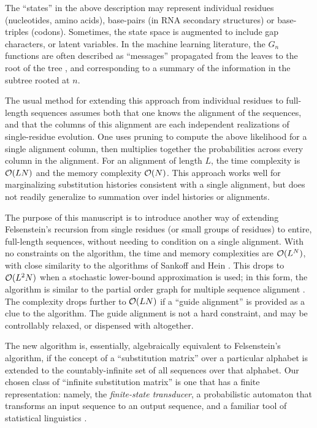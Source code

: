 \documentclass{article}
\begin{document}
The ``states'' in the above description may represent individual residues (nucleotides, amino acids), base-pairs (in RNA secondary structures) or base-triples (codons).
Sometimes, the state space is augmented to include gap characters, or latent variables.
In the machine learning literature, the $G_n$ functions are often described as ``messages'' propagated from the leaves to the root of the tree \cite{KschischangEtAl98},
and corresponding to a summary of the information in the subtree rooted at $n$.

The usual method for extending this approach from individual residues to full-length sequences assumes both that one knows the alignment of the sequences, 
and that the columns of this alignment are each independent realizations of single-residue evolution.  
One uses pruning to compute the above likelihood for a single alignment column,
then multiplies together the probabilities across every column in the alignment.
For an alignment of length $L$, the time complexity is ${\cal O}(LN)$ and the memory complexity ${\cal O}(N)$.
This approach works well for marginalizing substitution histories consistent with a single alignment,
but does not readily generalize to summation over indel histories or alignments.

The purpose of this manuscript is to introduce another way of extending Felsenstein's recursion from single residues (or small groups of residues)
to entire, full-length sequences, without needing to condition on a single alignment.
With no constraints on the algorithm,
the time and memory complexities are ${\cal O}(L^N)$,
with close similarity to the algorithms of Sankoff \cite{SankoffCedergren83} and Hein \cite{Hein2001}.
This drops to ${\cal O}(L^2 N)$ when a stochastic lower-bound approximation is used; in this form,
the algorithm is similar to the partial order graph for multiple sequence alignment \cite{LeeGrassoSharlow2002}.
The complexity drops further to ${\cal O}(LN)$ if a ``guide alignment'' is provided as a clue to the algorithm.
The guide alignment is not a hard constraint,
and may be controllably relaxed, or dispensed with altogether.

The new algorithm is, essentially, algebraically equivalent to Felsenstein's algorithm,
if the concept of a ``substitution matrix'' over a particular alphabet is extended to the countably-infinite set of all sequences over that alphabet.
Our chosen class of ``infinite substitution matrix'' is one that has a finite representation:
namely, the {\em finite-state transducer}, a probabilistic automaton that transforms an input sequence to an output sequence,
and a familiar tool of statistical linguistics \cite{MohriPereiraRiley2000}.
\end{document}
